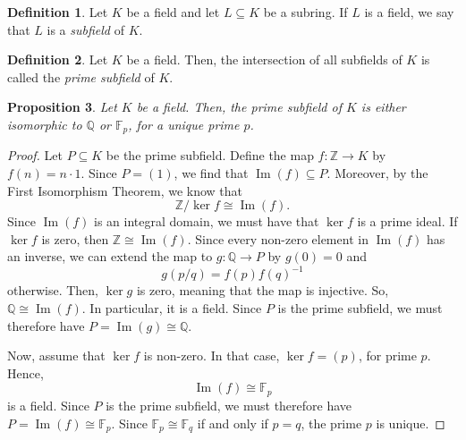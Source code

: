 \documentclass[a4paper, openany]{memoir}
\theoremstyle{definition}
\newtheorem{definition}{Definition}[section]
\theoremstyle{plain}
\newtheorem{proposition}[definition]{Proposition}
\begin{document}
    \begin{definition}
        Let $K$ be a field and let $L \subseteq K$ be a subring. If $L$ is a field, we say that $L$ is a \emph{subfield} of $K$.
    \end{definition}

    \begin{definition}
        Let $K$ be a field. Then, the intersection of all subfields of $K$ is called the \emph{prime subfield} of $K$.
    \end{definition}

    \begin{proposition}
        Let $K$ be a field. Then, the prime subfield of $K$ is either isomorphic to $\mathbb{Q}$ or $\mathbb{F}_p$, for a unique prime $p$.
    \end{proposition}
    \begin{proof}
        Let $P \subseteq K$ be the prime subfield. Define the map $f \colon \mathbb{Z} \to K$ by $f(n) = n \cdot 1$. Since $P = (1)$, we find that $\operatorname{Im}(f) \subseteq P$. Moreover, by the First Isomorphism Theorem, we know that
        \[\mathbb{Z}/\ker f \cong \operatorname{Im} (f).\]
        Since $\operatorname{Im}(f)$ is an integral domain, we must have that $\ker f$ is a prime ideal. If $\ker f$ is zero, then $\mathbb{Z} \cong \operatorname{Im}(f)$. Since every non-zero element in $\operatorname{Im}(f)$ has an inverse, we can extend the map to $g \colon \mathbb{Q} \to P$ by $g(0) = 0$ and
        \[g(p/q) = f(p) f(q)^{-1}\]
        otherwise. Then, $\ker g$ is zero, meaning that the map is injective. So, $\mathbb{Q} \cong \operatorname{Im} (f)$. In particular, it is a field. Since $P$ is the prime subfield, we must therefore have $P = \operatorname{Im}(g) \cong \mathbb{Q}$.

        Now, assume that $\ker f$ is non-zero. In that case, $\ker f = (p)$, for prime $p$. Hence,
        \[\operatorname{Im}(f) \cong \mathbb{F}_p\]
        is a field. Since $P$ is the prime subfield, we must therefore have $P = \operatorname{Im}(f) \cong \mathbb{F}_p$. Since $\mathbb{F}_p \cong \mathbb{F}_q$ if and only if $p = q$, the prime $p$ is unique.
    \end{proof}
\end{document}

